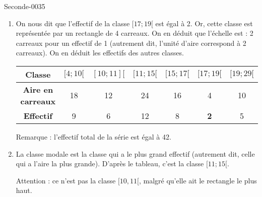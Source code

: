 
\begin{corrige}{Seconde-0035}

\begin{enumerate}
\item On nous dit que l'effectif de la classe $[17;19[$ est égal à
  2. Or, cette classe est représentée par un rectangle de 4
  carreaux. On en déduit que l'échelle est : 2 carreaux pour un
  effectif de 1 (autrement dit, l'unité d'aire correspond à 2
  carreaux).  On en déduit les effectifs des autres classes.
  \begin{center}
    \begin{tabular}{|c||c|c|c|c|c|c|}
        \hline
      \textbf{Classe} & $[4;10[$ & $[10;11][$ & $[11;15[$ & $[15;17[$ &
      $[17;19[$ & $[19;29[$  \\
          \hline
      \textbf{Aire en carreaux} & 18 & 12 & 24 & 16 & 4 & 10  \\
      \hline
      \textbf{Effectif} & 9 & 6 & 12 & 8 & \textbf{2} & 5  \\
      \hline
    \end{tabular}
  \end{center}
  Remarque  : l'effectif total de la série est égal à 42.

\item La classe modale est la classe qui a le plus grand effectif (autrement dit, celle qui a l'aire la plus grande). D'après le tableau, c'est la classe $[11;15[$.

        Attention : ce n'est pas la classe \( \mathopen[ 10 , 11 [\), malgré qu'elle ait le rectangle le plus haut.
\end{enumerate}


\end{corrige}
